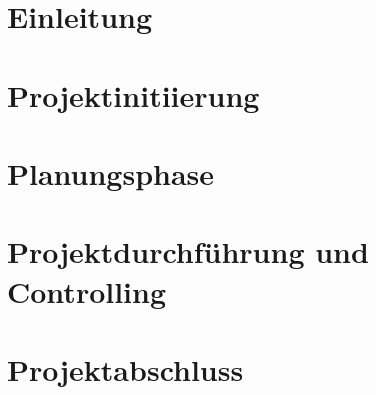 \documentclass[12pt,oneside]{article}
\begin{document}
\section{Einleitung}

\section{Projektinitiierung}


\section{Planungsphase}

\section{Projektdurchführung und Controlling}

\section{Projektabschluss}



\clearpage



\appendix
\end{document}

